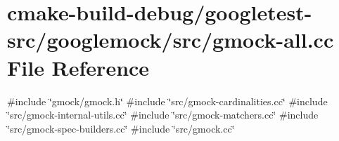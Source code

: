 \hypertarget{gmock-all_8cc}{}\section{cmake-\/build-\/debug/googletest-\/src/googlemock/src/gmock-\/all.cc File Reference}
\label{gmock-all_8cc}
{\ttfamily \#include \char`\"{}gmock/gmock.\+h\char`\"{}}\newline
{\ttfamily \#include \char`\"{}src/gmock-\/cardinalities.\+cc\char`\"{}}\newline
{\ttfamily \#include \char`\"{}src/gmock-\/internal-\/utils.\+cc\char`\"{}}\newline
{\ttfamily \#include \char`\"{}src/gmock-\/matchers.\+cc\char`\"{}}\newline
{\ttfamily \#include \char`\"{}src/gmock-\/spec-\/builders.\+cc\char`\"{}}\newline
{\ttfamily \#include \char`\"{}src/gmock.\+cc\char`\"{}}\newline
